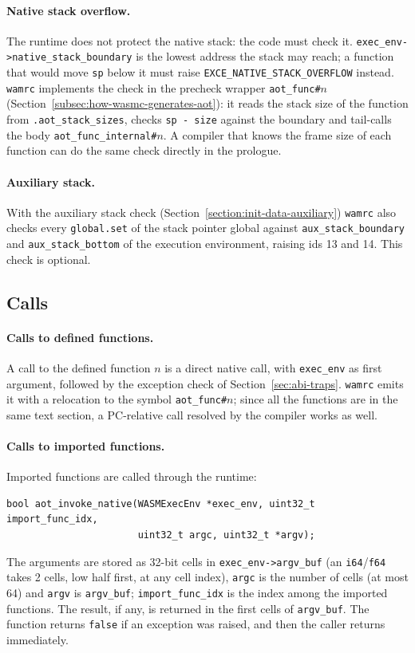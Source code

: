 \documentclass{article}
\begin{document}
\paragraph{Native stack overflow.}
The runtime does not protect the native stack: the code must check it.
\verb|exec_env->native_stack_boundary| is the lowest address the stack may reach; a function that would move \verb|sp| below it must raise \verb|EXCE_NATIVE_STACK_OVERFLOW| instead.
\texttt{wamrc} implements the check in the precheck wrapper \verb|aot_func#|$n$ (Section~\ref{subsec:how-wasmc-generates-aot}): it reads the stack size of the function from \verb|.aot_stack_sizes|, checks \verb|sp - size| against the boundary and tail-calls the body \verb|aot_func_internal#|$n$.
A compiler that knows the frame size of each function can do the same check directly in the prologue.

\paragraph{Auxiliary stack.}
With the auxiliary stack check (Section~\ref{section:init-data-auxiliary}) \texttt{wamrc} also checks every \verb|global.set| of the stack pointer global against \verb|aux_stack_boundary| and \verb|aux_stack_bottom| of the execution environment, raising ids 13 and 14. This check is optional.

\subsection{Calls}
\label{sec:abi-calls}
\paragraph{Calls to defined functions.}
A call to the defined function $n$ is a direct native call, with \verb|exec_env| as first argument, followed by the exception check of Section~\ref{sec:abi-traps}.
\texttt{wamrc} emits it with a relocation to the symbol \verb|aot_func#|$n$; since all the functions are in the same text section, a PC-relative call resolved by the compiler works as well.

\paragraph{Calls to imported functions.}
Imported functions are called through the runtime:
\begin{verbatim}
bool aot_invoke_native(WASMExecEnv *exec_env, uint32_t import_func_idx,
                       uint32_t argc, uint32_t *argv);
\end{verbatim}
The arguments are stored as 32-bit cells in \verb|exec_env->argv_buf| (an \verb|i64|/\verb|f64| takes 2 cells, low half first, at any cell index), \verb|argc| is the number of cells (at most 64) and \verb|argv| is \verb|argv_buf|; \verb|import_func_idx| is the index among the imported functions.
The result, if any, is returned in the first cells of \verb|argv_buf|.
The function returns \verb|false| if an exception was raised, and then the caller returns immediately.
\end{document}
